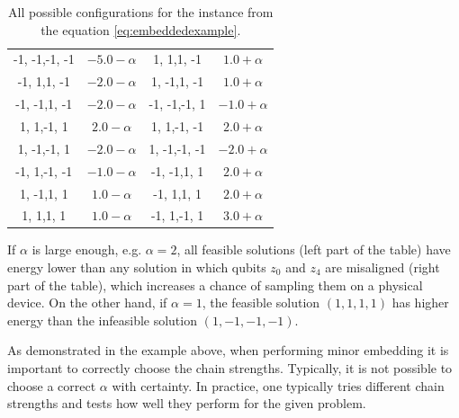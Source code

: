 \begin{example}
\begin{table}[h]
\begin{tabular}{|c|c|c|c|}
      \hline
      -1, -1,-1, -1                                               & $-5.0 -\alpha$                            & 1, 1,1, -1           & $1.0 + \alpha$  \\
      -1, 1,1, -1                                                 & $-2.0 -\alpha$                            & 1, -1,1, -1          & $1.0 + \alpha$  \\
      -1, -1,1, -1                                                & $-2.0 -\alpha$                            & -1, -1,-1, 1         & $-1.0 + \alpha$ \\
      1, 1,-1, 1                                                  & $2.0 -\alpha$                             & 1, 1,-1, -1          & $2.0 + \alpha$  \\
      1, -1,-1, 1                                                 & $-2.0 -\alpha$                            & 1, -1,-1, -1         & $-2.0 + \alpha$ \\
      -1, 1,-1, -1                                                & $-1.0 -\alpha$                            & -1, -1,1, 1          & $2.0 + \alpha$  \\
      1, -1,1, 1                                                  & $1.0 -\alpha$                             & -1, 1,1, 1           & $2.0 + \alpha$  \\
      1, 1,1, 1                                                   & $1.0  -\alpha$                            & -1, 1,-1, 1          & $3.0 + \alpha$  \\
      \hline
    \end{tabular}
    \caption{All possible configurations for the instance from the equation
      \eqref{eq:embeddedexample}.} \label{tab:embedded}
  \end{table}

  If $\alpha$ is large enough, e.g. $\alpha=2$, all feasible solutions (left part
  of the table) have energy lower than any solution in which qubits $z_0$ and
  $z_4$ are misaligned (right part of the table), which increases a chance of
  sampling them on a physical device. On the other hand, if $\alpha=1$, the
  feasible solution $(1,1,1,1)$ has higher energy than the infeasible solution
  $(1, -1, -1, -1)$.
\end{example}

As demonstrated in the example above, when performing minor embedding it is
important to correctly choose the chain strengths. Typically, it is not
possible to choose a correct $\alpha$ with certainty. In practice, one
typically tries different chain strengths and tests how well they perform for
the given problem.

